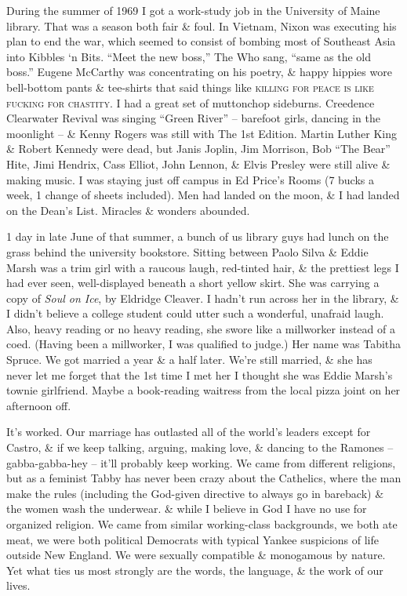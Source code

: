 \documentclass{article}
\numberwithin{equation}{section}
\begin{document}
 During the summer of 1969 I got a work-study job in the University of Maine library. That was a season both fair \& foul. In Vietnam, Nixon was executing his plan to end the war, which seemed to consist of bombing most of Southeast Asia into Kibbles `n Bits. ``Meet the new boss,'' The Who sang, ``same as the old boss.'' Eugene McCarthy was concentrating on his poetry, \& happy hippies wore bell-bottom pants \& tee-shirts that said things like \textsc{killing for peace is like fucking for chastity}. I had a great set of muttonchop sideburns. Creedence Clearwater Revival was singing ``Green River'' -- barefoot girls, dancing in the moonlight -- \& Kenny Rogers was still with The 1st Edition. Martin Luther King \& Robert Kennedy were dead, but Janis Joplin, Jim Morrison, Bob ``The Bear'' Hite, Jimi Hendrix, Cass Elliot, John Lennon, \& Elvis Presley were still alive \& making music. I was staying just off campus in Ed Price's Rooms (7 bucks a week, 1 change of sheets included). Men had landed on the moon, \& I had landed on the Dean's List. Miracles \& wonders abounded.

1 day in late June of that summer, a bunch of us library guys had lunch on the grass behind the university bookstore. Sitting between Paolo Silva \& Eddie Marsh was a trim girl with a raucous laugh, red-tinted hair, \& the prettiest legs I had ever seen, well-displayed beneath a short yellow skirt. She was carrying a copy of \textit{Soul on Ice}, by Eldridge Cleaver. I hadn't run across her in the library, \& I didn't believe a college student could utter such a wonderful, unafraid laugh. Also, heavy reading or no heavy reading, she swore like a millworker instead of a coed. (Having been a millworker, I was qualified to judge.) Her name was Tabitha Spruce. We got married a year \& a half later. We're still married, \& she has never let me forget that the 1st time I met her I thought she was Eddie Marsh's townie girlfriend. Maybe a book-reading waitress from the local pizza joint on her afternoon off.

 It's worked. Our marriage has outlasted all of the world's leaders except for Castro, \& if we keep talking, arguing, making love, \& dancing to the Ramones -- gabba-gabba-hey -- it'll probably keep working. We came from different religions, but as a feminist Tabby has never been crazy about the Cathelics, where the man make the rules (including the God-given directive to always go in bareback) \& the women wash the underwear. \& while I believe in God I have no use for organized religion. We came from similar working-class backgrounds, we both ate meat, we were both political Democrats with typical Yankee suspicions of life outside New England. We were sexually compatible \& monogamous by nature. Yet what ties us most strongly are the words, the language, \& the work of our lives.
\end{document}
